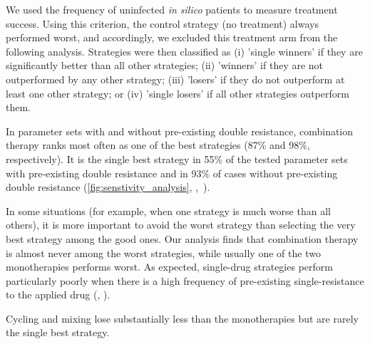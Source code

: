 We used the frequency of uninfected \textit{in silico} patients to measure treatment success.
Using this criterion, the control strategy (no treatment) always performed worst, and accordingly, we excluded this treatment arm from the following analysis.
Strategies were then classified as (i) 'single winners' if they are significantly better than all other strategies; (ii) 'winners' if they are not outperformed by any other strategy; (iii) 'losers' if they do not outperform at least one other strategy; or (iv) 'single losers' if all other strategies outperform them.

In parameter sets with and without pre-existing double resistance, combination therapy ranks most often as one of the best strategies (87\%  and 98\%, respectively).
It is the single best strategy in 55\% of the tested parameter sets with pre-existing double resistance and in 93\% of cases without pre-existing double resistance (\autoref{fig:senstivity_analysis}, ,~).

In some situations (for example, when one strategy is much worse than all others), it is more important to avoid the worst strategy than selecting the very best strategy among the good ones.
Our analysis finds that combination therapy is almost never among the worst strategies, while usually one of the two monotherapies performs worst.
As expected, single-drug strategies perform particularly poorly when there is a high frequency of pre-existing single-resistance to the applied drug (, ).

Cycling and mixing lose substantially less than the monotherapies but are rarely the single best strategy.

